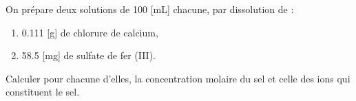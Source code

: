 \documentclass[
  11pt,
  a4paper,
  openany]{book}
\providecommand{\tightlist}{%
  \setlength{\itemsep}{0pt}\setlength{\parskip}{0pt}}
\begin{document}
\begin{Exercise}

On prépare deux solutions de 100 {[}mL{]} chacune, par dissolution de :

\begin{enumerate}
\def\labelenumi{\arabic{enumi}.}
\tightlist
\item
  0.111 {[}g{]} de chlorure de calcium,
\item
  58.5 {[}mg{]} de sulfate de fer (III).
\end{enumerate}

Calculer pour chacune d'elles, la concentration molaire du sel et celle des ions qui constituent le sel.


\end{Exercise}
\end{document}

